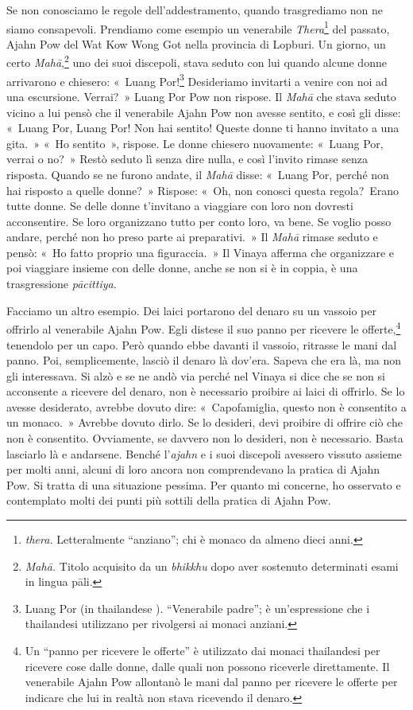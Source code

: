 Se non conosciamo le regole dell'addestramento, quando trasgrediamo non
ne siamo consapevoli. Prendiamo come esempio un venerabile
\emph{Thera}\footnote{\emph{thera.} Letteralmente ``anziano''; chi è
  monaco da almeno dieci anni.} del passato, Ajahn Pow del Wat Kow Wong
Got nella provincia di Lopburi. Un giorno, un certo
\emph{Mahā},\footnote{\emph{Mahā.} Titolo acquisito da un \emph{bhikkhu}
  dopo aver sostenuto determinati esami in lingua pāli.} uno dei suoi
discepoli, stava seduto con lui quando alcune donne arrivarono e
chiesero: «~Luang Por!\footnote{Luang Por (in thailandese ).
  ``Venerabile padre''; è un'espressione che i thailandesi utilizzano
  per rivolgersi ai monaci anziani.} Desideriamo invitarti a venire con
noi ad una escursione. Verrai?~» Luang Por Pow non rispose. Il
\emph{Mahā} che stava seduto vicino a lui pensò che il venerabile Ajahn
Pow non avesse sentito, e così gli disse: «~Luang Por, Luang Por! Non
hai sentito! Queste donne ti hanno invitato a una gita.~» «~Ho
sentito~», rispose. Le donne chiesero nuovamente: «~Luang Por, verrai o
no?~» Restò seduto lì senza dire nulla, e così l'invito rimase senza
risposta. Quando se ne furono andate, il \emph{Mahā} disse: «~Luang Por,
perché non hai risposto a quelle donne?~» Rispose: «~Oh, non conosci
questa regola?~Erano tutte donne. Se delle donne t'invitano a viaggiare
con loro non dovresti acconsentire. Se loro organizzano tutto per conto
loro, va bene. Se voglio posso andare, perché non ho preso parte ai
preparativi.~» Il \emph{Mahā} rimase seduto e pensò: «~Ho fatto proprio
una figuraccia.~» Il Vinaya afferma che organizzare e poi viaggiare
insieme con delle donne, anche se non si è in coppia, è una
trasgressione \emph{pācittiya}.

Facciamo un altro esempio. Dei laici portarono del denaro su un vassoio
per offrirlo al venerabile Ajahn Pow. Egli distese il suo panno per
ricevere le offerte,\footnote{Un ``panno per ricevere le offerte'' è
  utilizzato dai monaci thailandesi per ricevere cose dalle donne, dalle
  quali non possono riceverle direttamente. Il venerabile Ajahn Pow
  allontanò le mani dal panno per ricevere le offerte per indicare che
  lui in realtà non stava ricevendo il denaro.} tenendolo per un capo.
Però quando ebbe davanti il vassoio, ritrasse le mani dal panno. Poi,
semplicemente, lasciò il denaro là dov'era. Sapeva che era là, ma non
gli interessava. Si alzò e se ne andò via perché nel Vinaya si dice che
se non si acconsente a ricevere del denaro, non è necessario proibire ai
laici di offrirlo. Se lo avesse desiderato, avrebbe dovuto dire:
«~Capofamiglia, questo non è consentito a un monaco.~» Avrebbe dovuto
dirlo. Se lo desideri, devi proibire di offrire ciò che non è
consentito. Ovviamente, se davvero non lo desideri, non è necessario.
Basta lasciarlo là e andarsene. Benché l'\emph{ajahn} e i suoi discepoli
avessero vissuto assieme per molti anni, alcuni di loro ancora non
comprendevano la pratica di Ajahn Pow. Si tratta di una situazione
pessima. Per quanto mi concerne, ho osservato e contemplato molti dei
punti più sottili della pratica di Ajahn Pow.

